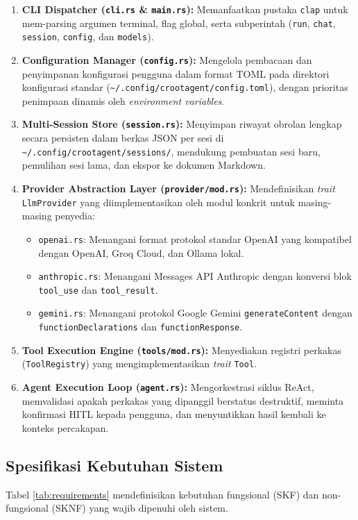 \begin{enumerate}
    \item \textbf{CLI Dispatcher (\texttt{cli.rs} \& \texttt{main.rs}):} Memanfaatkan pustaka \texttt{clap} untuk mem-parsing argumen terminal, flag global, serta subperintah (\texttt{run}, \texttt{chat}, \texttt{session}, \texttt{config}, dan \texttt{models}).
    \item \textbf{Configuration Manager (\texttt{config.rs}):} Mengelola pembacaan dan penyimpanan konfigurasi pengguna dalam format TOML pada direktori konfigurasi standar (\texttt{\~{}/.config/crootagent/config.toml}), dengan prioritas penimpaan dinamis oleh \textit{environment variables}.
    \item \textbf{Multi-Session Store (\texttt{session.rs}):} Menyimpan riwayat obrolan lengkap secara persisten dalam berkas JSON per sesi di \texttt{\~{}/.config/crootagent/sessions/}, mendukung pembuatan sesi baru, pemulihan sesi lama, dan ekspor ke dokumen Markdown.
    \item \textbf{Provider Abstraction Layer (\texttt{provider/mod.rs}):} Mendefinisikan \textit{trait} \texttt{LlmProvider} yang diimplementasikan oleh modul konkrit untuk masing-masing penyedia:
    \begin{itemize}
        \item \texttt{openai.rs}: Menangani format protokol standar OpenAI yang kompatibel dengan OpenAI, Groq Cloud, dan Ollama lokal.
        \item \texttt{anthropic.rs}: Menangani Messages API Anthropic dengan konversi blok \texttt{tool\_use} dan \texttt{tool\_result}.
        \item \texttt{gemini.rs}: Menangani protokol Google Gemini \texttt{generateContent} dengan \texttt{functionDeclarations} dan \texttt{functionResponse}.
    \end{itemize}
    \item \textbf{Tool Execution Engine (\texttt{tools/mod.rs}):} Menyediakan registri perkakas (\texttt{ToolRegistry}) yang mengimplementasikan \textit{trait} \texttt{Tool}.
    \item \textbf{Agent Execution Loop (\texttt{agent.rs}):} Mengorkestrasi siklus ReAct, memvalidasi apakah perkakas yang dipanggil berstatus destruktif, meminta konfirmasi HITL kepada pengguna, dan menyuntikkan hasil kembali ke konteks percakapan.
\end{enumerate}

\subsection{Spesifikasi Kebutuhan Sistem}
Tabel \ref{tab:requirements} mendefinisikan kebutuhan fungsional (SKF) dan non-fungsional (SKNF) yang wajib dipenuhi oleh sistem.

